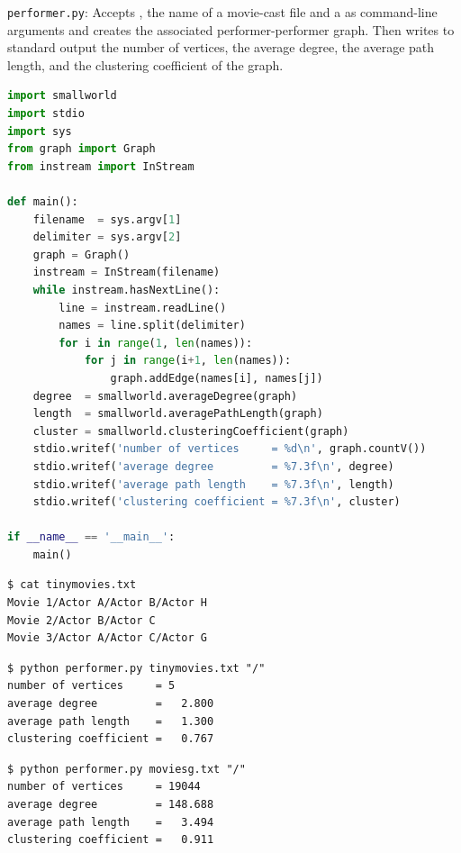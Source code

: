 \documentclass[8pt,a4paper,compress,handout]{beamer}
\begin{document}
\begin{frame}[fragile]
\begin{framed}
\tiny \lstinline{performer.py}: Accepts , the name of a movie-cast file and a  as command-line arguments and creates the associated performer-performer graph. Then writes
to standard output the number of vertices, the average degree, 
the average path length, and the clustering coefficient of the graph.
\end{framed}

\begin{lstlisting}[language=Python]
import smallworld
import stdio
import sys
from graph import Graph
from instream import InStream

def main():
    filename  = sys.argv[1]
    delimiter = sys.argv[2]
    graph = Graph()
    instream = InStream(filename)
    while instream.hasNextLine():
        line = instream.readLine()
        names = line.split(delimiter)
        for i in range(1, len(names)):
            for j in range(i+1, len(names)):
                graph.addEdge(names[i], names[j])
    degree  = smallworld.averageDegree(graph)
    length  = smallworld.averagePathLength(graph)
    cluster = smallworld.clusteringCoefficient(graph)
    stdio.writef('number of vertices     = %d\n', graph.countV())
    stdio.writef('average degree         = %7.3f\n', degree)
    stdio.writef('average path length    = %7.3f\n', length)
    stdio.writef('clustering coefficient = %7.3f\n', cluster)

if __name__ == '__main__':
    main()
\end{lstlisting}
\end{frame}

\begin{frame}[fragile]
\begin{lstlisting}[language={}]
$ cat tinymovies.txt
Movie 1/Actor A/Actor B/Actor H
Movie 2/Actor B/Actor C
Movie 3/Actor A/Actor C/Actor G
\end{lstlisting}

\begin{lstlisting}[language={}]
$ python performer.py tinymovies.txt "/"
number of vertices     = 5
average degree         =   2.800
average path length    =   1.300
clustering coefficient =   0.767
\end{lstlisting}

\begin{lstlisting}[language={}]
$ python performer.py moviesg.txt "/"
number of vertices     = 19044
average degree         = 148.688
average path length    =   3.494
clustering coefficient =   0.911
\end{lstlisting}
\end{frame}
\end{document}
